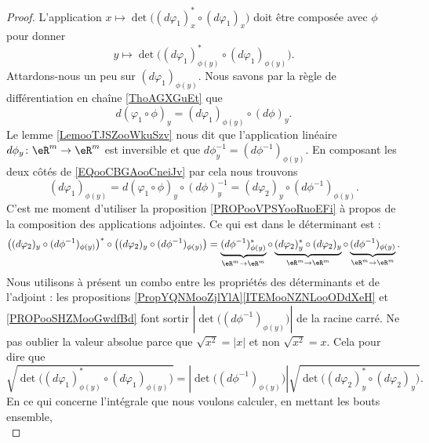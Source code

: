 \begin{proof}
    L'application \( x\mapsto \det\big( (d\varphi_1)_x^*\circ(d\varphi_1)_x \big)\) doit être composée avec \( \phi\) pour donner
    \begin{equation}
        y\mapsto\det\big( (d\varphi_1)_{\phi(y)}^*\circ(d\varphi_1)_{\phi(y)} \big).
    \end{equation}
    Attardons-nous un peu sur \( (d\varphi_1)_{\phi(y)}\). Nous savons par la règle de différentiation en chaîne \ref{ThoAGXGuEt} que
    \begin{equation}        \label{EQooCBGAooCneiJv}
        d(\varphi_1\circ \phi)_y=(d\varphi_1)_{\phi(y)}\circ(d\phi)_y.
    \end{equation}
    Le lemme \ref{LemooTJSZooWkuSzv} nous dit que l'application linéaire \( d\phi_y\colon \eR^m\to \eR^m\) est inversible et que \( d\phi_y^{-1}=(d\phi^{-1})_{\phi(y)}\). En composant les deux côtés de \eqref{EQooCBGAooCneiJv} par cela nous trouvons
    \begin{equation}
        (d\varphi_1)_{\phi(y)}=d(\varphi_1\circ\phi)_y\circ(d\phi)_y^{-1}=(d\varphi_2)_y\circ(d\phi^{-1})_{\phi(y)}.
    \end{equation}
    C'est me moment d'utiliser la proposition \ref{PROPooVPSYooRuoEFi} à propos de la composition des applications adjointes. Ce qui est dans le déterminant est :
    \begin{equation}
        \big( (d\varphi_2)_y\circ(d\phi^{-1})_{\phi(y)} \big)^*\circ\big( (d\varphi_2)_y\circ(d\phi^{-1})_{\phi(y)} \big)=
        \underbrace{(d\phi^{-1})_{\phi(y)}^*}_{\eR^m\to \eR^m}\circ\underbrace{(d\varphi_2)^*_y\circ(d\varphi_2)_y}_{\eR^m\to \eR^m}\circ\underbrace{(d\phi^{-1})_{\phi(y)}}_{\eR^m\to \eR^m}.
    \end{equation}
    Nous utilisons à présent un combo entre les propriétés des déterminants et de l'adjoint : les propositions \ref{PropYQNMooZjlYlA}\ref{ITEMooNZNLooODdXeH} et \ref{PROPooSHZMooGwdfBd} font sortir \( | \det\big( (d\phi^{-1})_{\phi(y)} \big) |\) de la racine carré. Ne pas oublier la valeur absolue parce que \( \sqrt{ x^2 }=| x |\) et non \( \sqrt{ x^2 }=x\). Cela pour dire que
    \begin{equation}
        \sqrt{ \det\big( (d\varphi_1)_{\phi(y)}^*\circ(d\varphi_1)_{\phi(y)} \big) }=| \det\big( (d\phi^{-1})_{\phi(y)} \big) |\sqrt{ \det\big( (d\varphi_2)_y^*\circ(d\varphi_2)_y \big) }.
    \end{equation}
    En ce qui concerne l'intégrale que nous voulons calculer, en mettant les bouts ensemble,
    \begin{equation}

\end{equation}
\end{proof}
